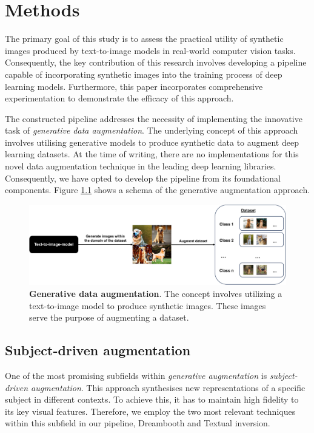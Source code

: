 \chapter{Methods} \label{sec:methods}

The primary goal of this study is to assess the practical utility of synthetic images produced by text-to-image models in real-world computer vision tasks. Consequently, the key contribution of this research involves developing a pipeline capable of incorporating synthetic images into the training process of deep learning models. Furthermore, this paper incorporates comprehensive experimentation to demonstrate the efficacy of this approach.

The constructed pipeline addresses the necessity of implementing the innovative task of \textit{generative data augmentation}. The underlying concept of this approach involves utilising generative models to produce synthetic data to augment deep learning datasets. At the time of writing, there are no implementations for this novel data augmentation technique in the leading deep learning libraries. Consequently, we have opted to develop the pipeline from its foundational components. Figure \ref{fig:genaug} shows a schema of the generative augmentation approach.

\begin{figure}
    \centering
    \includegraphics[width=1\textwidth]{Pictures/generative-augmentation.pdf}
    \caption{\textbf{Generative data augmentation}. The concept involves utilizing a text-to-image model to produce synthetic images. These images serve the purpose of augmenting a dataset.}
    \label{fig:genaug}
\end{figure}

\section{Subject-driven augmentation} \label{sec: sdAugmentation}

One of the most promising subfields within \textit{generative augmentation} is \textit{subject-driven augmentation}. This approach synthesises new representations of a specific subject in different contexts. To achieve this, it has to maintain high fidelity to its key visual features. Therefore, we employ the two most relevant techniques within this subfield in our pipeline, Dreambooth and Textual inversion.


